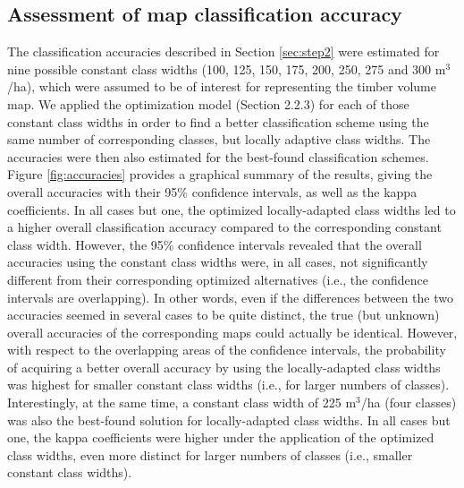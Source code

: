 \subsection{Assessment of map classification accuracy}
\label{sec:mapacc}

The classification accuracies described in Section \ref{sec:step2} were estimated for nine possible constant class widths (100, 125, 150, 175, 200, 250, 275 and 300 m$^3$/ha), which were assumed to be of interest for representing the timber volume map. We applied the optimization model (Section 2.2.3) for each of those constant class widths in order to find a better classification scheme using the same number of corresponding classes, but locally adaptive class widths. The accuracies were then also estimated for the best-found classification schemes. Figure \ref{fig:accuracies} provides a graphical summary of the results, giving the overall accuracies with their 95\% confidence intervals, as well as the kappa coefficients. In all cases but one, the optimized locally-adapted class widths led to a higher overall classification accuracy compared to the corresponding constant class width. However, the 95\% confidence intervals revealed that the overall accuracies using the constant class widths were, in all cases, not significantly different from their corresponding optimized alternatives (i.e., the confidence intervals are overlapping). In other words, even if the differences between the two accuracies seemed in several cases to be quite distinct, the true (but unknown) overall accuracies of the corresponding maps could actually be identical. However, with respect to the overlapping areas of the confidence intervals, the probability of acquiring a better overall accuracy by using the locally-adapted class widths was highest for smaller constant class widths (i.e., for larger numbers of classes). Interestingly, at the same time, a constant class width of 225 m$^3$/ha (four classes) was also the best-found solution for locally-adapted class widths. In all cases but one, the kappa coefficients were higher under the application of the optimized class widths, even more distinct for larger numbers of classes (i.e., smaller constant class widths).

